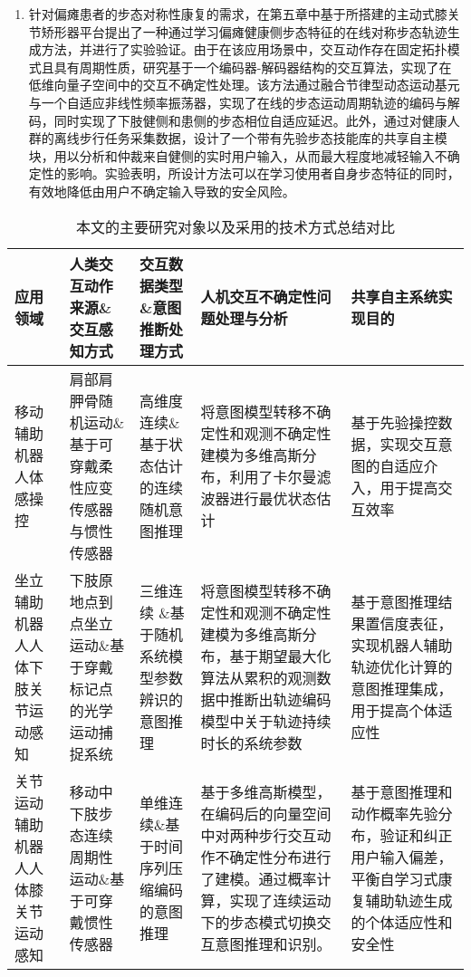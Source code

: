 \begin{enumerate}
\item 针对偏瘫患者的步态对称性康复的需求，在第五章中基于所搭建的主动式膝关节矫形器平台提出了一种通过学习偏瘫健康侧步态特征的在线对称步态轨迹生成方法，并进行了实验验证。由于在该应用场景中，交互动作存在固定拓扑模式且具有周期性质，研究基于一个编码器-解码器结构的交互算法，实现了在低维向量子空间中的交互不确定性处理。该方法通过融合节律型动态运动基元与一个自适应非线性频率振荡器，实现了在线的步态运动周期轨迹的编码与解码，同时实现了下肢健侧和患侧的步态相位自适应延迟。此外，通过对健康人群的离线步行任务采集数据，设计了一个带有先验步态技能库的共享自主模块，用以分析和仲裁来自健侧的实时用户输入，从而最大程度地减轻输入不确定性的影响。实验表明，所设计方法可以在学习使用者自身步态特征的同时，有效地降低由用户不确定输入导致的安全风险。
\end{enumerate}

\begin{table}[htb]
        \centering
        \caption{本文的主要研究对象以及采用的技术方式总结对比}
        \begin{tabular}{p{2cm}p{2cm}p{2cm}p{3.2cm}p{3.2cm}}
        \toprule
                应用领域& 人类交互动作来源\&交互感知方式 & 交互数据类型\&意图推断处理方式 & 人机交互不确定性问题处理与分析 & 共享自主系统实现目的 \\ 
        \midrule
                移动辅助机器人体感操控 & 肩部肩胛骨随机运动\&基于可穿戴柔性应变传感器与惯性传感器 & 高维度连续\&基于状态估计的连续随机意图推理 &将意图模型转移不确定性和观测不确定性建模为多维高斯分布，利用了卡尔曼滤波器进行最优状态估计 & 基于先验操控数据，实现交互意图的自适应介入，用于提高交互效率\\ 
        
                坐立辅助机器人人体下肢关节运动感知 & 下肢原地点到点坐立运动\&基于穿戴标记点的光学运动捕捉系统 & 三维连续 \&基于随机系统模型参数辨识的意图推理	&将意图模型转移不确定性和观测不确定性建模为多维高斯分布，基于期望最大化算法从累积的观测数据中推断出轨迹编码模型中关于轨迹持续时长的系统参数 & 基于意图推理结果置信度表征，实现机器人辅助轨迹优化计算的意图推理集成，用于提高个体适应性\\ 
        
                关节运动辅助机器人人体膝关节运动感知 & 移动中下肢步态连续周期性运动\&基于可穿戴惯性传感器 & 单维连续\&基于时间序列压缩编码的意图推理	&基于多维高斯模型，在编码后的向量空间中对两种步行交互动作不确定性分布进行了建模。通过概率计算，实现了连续运动下的步态模式切换交互意图推理和识别。& 基于意图推理和动作概率先验分布，验证和纠正用户输入偏差，平衡自学习式康复辅助轨迹生成的个体适应性和安全性\\ 
        \bottomrule
        \end{tabular}
        \label{tab:6-1} 
\end{table}  
